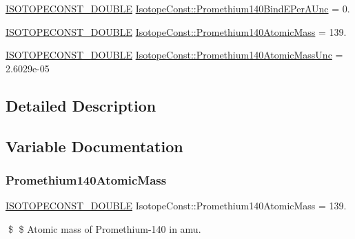 \begin{DoxyCompactItemize}
\item 
\mbox{\hyperlink{group___isotope_const-_macros_ga8f45a7272ce02c0b4c65c44636ed719a}{I\+S\+O\+T\+O\+P\+E\+C\+O\+N\+S\+T\+\_\+\+D\+O\+U\+B\+LE}} \mbox{\hyperlink{group___isotope_const-_promethium-_pm140_gac4269ea76ffc79db2abe8f6c90896a2b}{Isotope\+Const\+::\+Promethium140\+Bind\+E\+Per\+A\+Unc}} = 0.
\item 
\mbox{\hyperlink{group___isotope_const-_macros_ga8f45a7272ce02c0b4c65c44636ed719a}{I\+S\+O\+T\+O\+P\+E\+C\+O\+N\+S\+T\+\_\+\+D\+O\+U\+B\+LE}} \mbox{\hyperlink{group___isotope_const-_promethium-_pm140_gab41d8d3b9eac94f23d0f794d359ba499}{Isotope\+Const\+::\+Promethium140\+Atomic\+Mass}} = 139.
\item 
\mbox{\hyperlink{group___isotope_const-_macros_ga8f45a7272ce02c0b4c65c44636ed719a}{I\+S\+O\+T\+O\+P\+E\+C\+O\+N\+S\+T\+\_\+\+D\+O\+U\+B\+LE}} \mbox{\hyperlink{group___isotope_const-_promethium-_pm140_ga4736dd3f0c8410bd39c53f6ceb579bb7}{Isotope\+Const\+::\+Promethium140\+Atomic\+Mass\+Unc}} = 2.\+6029e-\/05
\end{DoxyCompactItemize}


\subsection{Detailed Description}


\subsection{Variable Documentation}
\mbox{\label{group___isotope_const-_promethium-_pm140_gab41d8d3b9eac94f23d0f794d359ba499}} 
\subsubsection{\texorpdfstring{Promethium140\+Atomic\+Mass}{Promethium140AtomicMass}}
{\footnotesize\ttfamily \mbox{\hyperlink{group___isotope_const-_macros_ga8f45a7272ce02c0b4c65c44636ed719a}{I\+S\+O\+T\+O\+P\+E\+C\+O\+N\+S\+T\+\_\+\+D\+O\+U\+B\+LE}} Isotope\+Const\+::\+Promethium140\+Atomic\+Mass = 139.}

\$ \$ Atomic mass of Promethium-\/140 in amu. \mbox{\label{group___isotope_const-_promethium-_pm140_ga4736dd3f0c8410bd39c53f6ceb579bb7}} 
